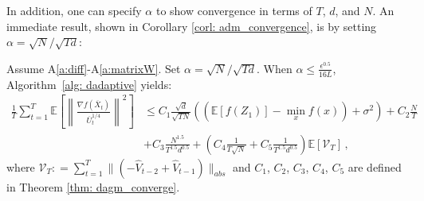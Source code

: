 \documentclass[anon,12pt]{colt2021} %
\begin{document}
In addition, one can specify $\alpha$ to show convergence in terms of $T$, $d$, and $N$. 
An immediate result, shown in Corollary \ref{corl: adm_convergence}, is by setting $\alpha = \sqrt{N}/\sqrt{Td}$:
\begin{boxcoro}\label{corl: adm_convergence}
Assume A\ref{a:diff}-A\ref{a:matrixW}. Set $\alpha = \sqrt{N}/\sqrt{Td}$.
When $\alpha  \leq \frac{\epsilon^{0.5}}{16L} $, Algorithm~\ref{alg: dadaptive} yields:
 {\small
	\begin{align}\label{eq: thm1}
	\frac{1}{T}\sum_{t=1}^T  \mathbb E \left [\left\|\frac{\nabla f( \overline X_{t})}{\overline U_{t}^{1/4}}\right\|^2  \right]
&	\leq   C_1 \frac{\sqrt{d}}{\sqrt{TN}} \left(( \mathbb E  [f( Z_{1})]  -  \min_x  f(x)) +    \sigma^2 \right)  +  C_2 \frac{N}{T}  \\
	&+  C_3 \frac{N^{1.5}}{T^{1.5}d^{0.5}} 
    +  \left(C_4 \frac{1}{T\sqrt{N}} +  C_5   \frac{1}{T^{1.5}d^{0.5}}\right) \mathbb E \left[\mathcal V_T \right]\, , \nonumber 
	\end{align}
	}
	where $ \mathcal{V}_T : = \sum_{t=1}^{T}   \|    (- \hat V_{t-2} + \hat V_{t-1} ) \|_{abs}$ and $C_1$, $C_2$, $C_3$, $C_4$,  $C_5$ are defined in Theorem \ref{thm: dagm_converge}.
\end{boxcoro}
\end{document}
